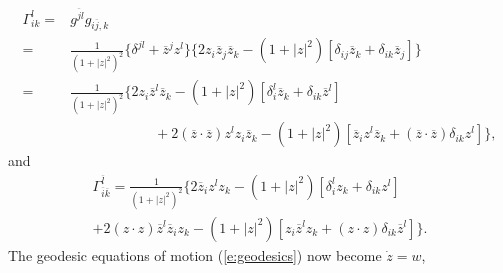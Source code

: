 \begin{equation}
\begin{split}
    \Gamma^l_{ik} =& g^{\overline{j}l} g_{i\overline{j},k}\\
        =& \frac{1}{ \left( 1 + \left| z\right|^2 \right)^2 }
        \biggl\lbrace
            \delta^{jl} + \overline{z}^jz^l
        \biggr\rbrace
        \biggl\lbrace
            2z_i\overline{z}_j\overline{z}_k
            - \left( 1 + \left| z\right|^2 \right) \left[
                \delta_{ij}\overline{z}_k 
                + \delta_{ik}\overline{z}_j 
            \right]
        \biggr\rbrace\\
        =& 
        \frac{1}{ \left( 1 + \left| z\right|^2 \right)^2 }
        \biggl\lbrace
            2z_i\overline{z}^l\overline{z}_k
            - \left( 1 + \left| z\right|^2 \right) \left[
                \delta_i^l\overline{z}_k 
                + \delta_{ik}\overline{z}^l 
            \right]\\
        &\qquad\qquad\qquad    + 2\left( \overline{z}\cdot 
                                         \overline{z}\right) z^lz_i\overline{z}_k
            - \left( 1 + \left| z\right|^2 \right) \left[
                \overline{z}_i z^l\overline{z}_k 
                + \left( \overline{z}\cdot \overline{z}\right)\delta_{ik}z^l 
            \right]
        \biggr\rbrace,
\end{split}
\end{equation}
and
\begin{multline}
    \Gamma^{\overline{l}}_{\overline{i}\overline{k}} 
        = 
        \frac{1}{ \left( 1 + \left| z\right|^2 \right)^2 }
        \biggl\lbrace
            2\overline{z}_iz^lz_k
            - \left( 1 + \left| z\right|^2 \right) \left[
                \delta_i^lz_k 
                + \delta_{ik}z^l 
            \right]\\
        + 2\left( z\cdot z\right) \overline{z}^l\overline{z}_iz_k
            - \left( 1 + \left| z\right|^2 \right) \left[
                z_i \overline{z}^lz_k 
                + \left( z\cdot z\right)\delta_{ik}\overline{z}^l 
            \right]
        \biggr\rbrace.
\end{multline}
The geodesic equations of motion (\ref{e:geodesics}) now become
$\dot{z}=w$,
